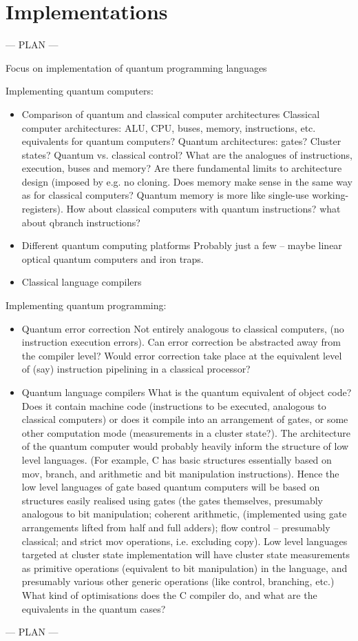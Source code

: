\section{Implementations}\label{Implementations}

--- PLAN ---

Focus on implementation of quantum programming languages

Implementing quantum computers:
\begin{itemize}
\item Comparison of quantum and classical computer architectures
Classical computer architectures: ALU, CPU, buses, memory, instructions, etc. equivalents for quantum computers? Quantum architectures: gates? Cluster states? Quantum vs. classical control? What are the analogues of instructions, execution, buses and memory? Are there fundamental limits to architecture design (imposed by e.g. no cloning. Does memory make sense in the same way as for classical computers? Quantum memory is more like single-use working-registers). How about classical computers with quantum instructions? what about qbranch instructions?   
\item Different quantum computing platforms 
Probably just a few -- maybe linear optical quantum computers and iron traps. 
\item Classical language compilers
\end{itemize}
Implementing quantum programming:
\begin{itemize}
\item Quantum error correction
Not entirely analogous to classical computers, (no instruction execution errors). Can error correction be abstracted away from the compiler level? Would error correction take place at the equivalent level of (say) instruction pipelining in a classical processor?    
\item Quantum language compilers
What is the quantum equivalent of object code? Does it contain machine code (instructions to be executed, analogous to classical computers) or does it compile into an arrangement of gates, or some other computation mode (measurements in a cluster state?). The architecture of the quantum computer would probably heavily inform the structure of low level languages. (For example, C has basic structures essentially based on mov, branch, and arithmetic and bit manipulation instructions). Hence the low level languages of gate based quantum computers will be based on structures easily realised using gates (the gates themselves, presumably analogous to bit manipulation; coherent arithmetic, (implemented using gate arrangements lifted from half and full adders); flow control -- presumably classical; and strict mov operations, i.e. excluding copy). Low level languages targeted at cluster state implementation will have cluster state measurements as primitive operations (equivalent to bit manipulation) in the language, and presumably various other generic operations (like control, branching, etc.) What kind of optimisations does the C compiler do, and what are the equivalents in the quantum cases? 
\end{itemize}
--- PLAN ---

